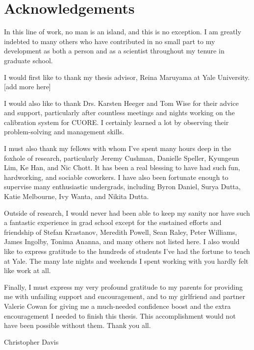\chapter*{Acknowledgements}
In this line of work, no man is an island, and this is no exception. I am greatly indebted to many others who have contributed in no small part to my development as both a person and as a scientist throughout my tenure in graduate school.

I would first like to thank my thesis advisor, Reina Maruyama at Yale University. [add more here]

I would also like to thank Drs. Karsten Heeger and Tom Wise for their advice and support, particularly after countless meetings and nights working on the calibration system for CUORE. I certainly learned a lot by observing their problem-solving and management skills.

I must also thank my fellows with whom I've spent many hours deep in the foxhole of research, particularly Jeremy Cushman, Danielle Speller, Kyungeun Lim, Ke Han, and Nic Chott. It has been a real blessing to have had such fun, hardworking, and sociable coworkers. I have also been fortunate enough to supervise many enthusiastic undergrads, including Byron Daniel, Surya Dutta, Katie Melbourne, Ivy Wanta, and Nikita Dutta.

Outside of research, I would never had been able to keep my sanity nor have such a fantastic experience in grad school except for the sustained efforts and friendship of Stefan Krastanov, Meredith Powell, Sean Raley, Peter Williams, James Ingolby, Tonima Ananna, and many others not listed here. I also would like to express gratitude to the hundreds of students I've had the fortune to teach at Yale. The many late nights and weekends I spent working with you hardly felt like work at all.

Finally, I must express my very profound gratitude to my parents for providing me with unfailing support and encouragement, and to my girlfriend and partner Valerie Cowan for giving me a much-needed confidence boost and the extra encouragement I needed to finish this thesis. This accomplishment would not have been possible without them. Thank you all.

Christopher Davis
